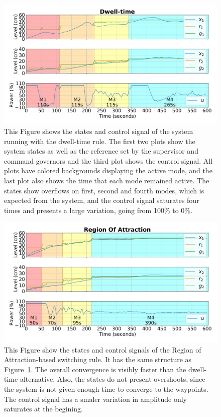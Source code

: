 \begin{figure}[ht!]
  \centering
  \includegraphics[width=\linewidth]{imgs/tanks-dwell}
  \caption[Experimental dwell-time states.]{This Figure shows the states and
    control signal of the system running with the dwell-time rule. The first two
    plots show the system states as well as the reference set by the supervisor
    and command governors and the third plot shows the control signal. All plots
    have colored backgrounds displaying the active mode, and the last plot also
    shows the time that each mode remained active. The states show overflows on
    first, second and fourth modes, which is expected from the system, and the
    control signal saturates four times and presents a large variation, going
    from 100\% to 0\%.}%
  \label{fig:tanks-dwell}
\end{figure}

\begin{figure}[ht!]
  \centering
  \includegraphics[width=\linewidth]{imgs/tanks-roa}
  \caption[Experimental RoA states.]{This Figure show the states and control
    signals of the Region of Attraction-based switching rule. It has the same
    structure as Figure~\ref{fig:tanks-dwell}. The overall convergence is
    visibly faster than the dwell-time alternative. Also, the states do not
    present overshoots, since the system is not given enough time to converge to
    the waypoints. The control signal has a smaler variation in amplitude only
    saturates at the begining.}%
  \label{fig:tanks-roa}
\end{figure}
